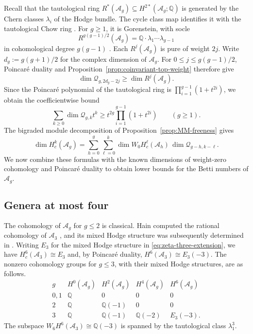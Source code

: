 \documentclass[12 pt]{amsart}
\newcommand{\QQ}{\mathbb{Q}}
\newcommand{\cA}{\mathcal{A}}
\newcommand{\cQ}{\mathcal{Q}}
\newcommand{\<}{\langle}
\renewcommand{\>}{\rangle}
\theoremstyle{definition}
\begin{document}
Recall that the tautological ring $R^*(\cA_g) \subseteq H^{2*}(\cA_g; \QQ)$ is generated by the Chern classes $\lambda_i$ of the Hodge bundle. The cycle class map identifies it with the tautological Chow ring \cite[Theorem~13]{GiansiracusaKupersTshishiku}. For $g \geq 1$, it is Gorenstein, with socle
\[
R^{g(g - 1)/2}(\cA_g) = \QQ \cdot \lambda_1 \cdots \lambda_{g - 1}
\]
in cohomological degree $g(g - 1)$ \cite[Theorem~2.5]{vanDerGeerCycles}. Each $R^j(\cA_g)$ is pure of weight $2j$. Write $d_g := g(g + 1)/2$ for the complex dimension of $\cA_g$. For $0 \leq j \leq g(g - 1)/2$, Poincar\'e duality and Proposition~\ref{prop:coinvariant-top-weight} therefore give
\[
\dim \cQ_{g, 2d_g - 2j} \geq \dim R^j(\cA_g).
\]
Since the Poincar\'e polynomial of the tautological ring is $\prod_{i = 1}^{g - 1}(1 + t^{2i})$,
we obtain the coefficientwise bound
\begin{equation}\label{eq:tautological-coinvariant-bound}
\sum_{k \geq 0} \dim \cQ_{g, k} t^k \geq t^{2g} \prod_{i = 1}^{g - 1}(1 + t^{2i}) \qquad (g \geq 1).
\end{equation}
The bigraded module decomposition of Proposition~\ref{prop:MM-freeness} gives
\begin{equation}\label{eq:coinvariant-dimension-convolution}
\dim H_c^k(\cA_g) = \sum_{h = 0}^g \sum_{\ell = 0}^k \dim W_0 H_c^\ell(\cA_h) \, \dim \cQ_{g - h, k - \ell}.
\end{equation}
We now combine these formulas with the known dimensions of weight-zero cohomology and Poincar\'e duality to obtain lower bounds for the Betti numbers of $\cA_g$.

\subsection{Genera at most four}\label{sec:betti-small-genus}

The cohomology of $\cA_g$ for $g \leq 2$ is classical. Hain computed the rational cohomology of $\cA_3$ \cite[Theorem~1]{HainA3}, and its mixed Hodge structure was subsequently determined in \cite[Theorem~1.19]{BCGP}. Writing $E_3$ for the mixed Hodge structure in \eqref{eq:zeta-three-extension}, we have $H_c^6(\cA_3) \cong E_3$ and, by Poincar\'e duality, $H^6(\cA_3) \cong E_3(-3)$. The nonzero cohomology groups for $g \leq 3$, with their mixed Hodge structures, are as follows.
\[
\begin{array}{c|cccc}
g & H^0(\cA_g) & H^2(\cA_g) & H^4(\cA_g) & H^6(\cA_g)\\ \hline
0, 1 & \QQ & 0 & 0 & 0\\
2 & \QQ & \QQ(-1) & 0 & 0\\
3 & \QQ & \QQ(-1) & \QQ(-2) & E_3(-3).
\end{array}
\]
The subspace $W_6 H^6(\cA_3) \cong \QQ(-3)$ is spanned by the tautological class $\lambda_1^3$.
\end{document}
